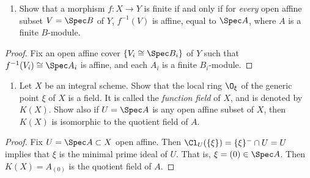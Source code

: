 \documentclass[12pt]{amsart}
\begin{document}
 \begin{enumerate}
   \item[3.4.] {
       Show that a morphism $f:X\to Y$ is finite if and only if for \emph{every} open affine subset $V=\Spec B$ of $Y$, $f^{-1}(V)$ is affine, equal to $\Spec A$, where $A$ is a finite $B$-module.
     }
 \end{enumerate}
 
 \begin{proof}
   Fix an open affine cover $\{V_i\cong \Spec B_i\}$ of $Y$ such that $f^{-1}(V_i)\cong \Spec A_i$ is affine, and each $A_i$ is a finite $B_i$-module.
 \end{proof}
 
 \begin{enumerate}
   \item[3.6.] {
       Let $X$ be an integral scheme.
       Show that the local ring $\O_\xi$ of the generic point $\xi$ of $X$ is a field.
       It is called the \emph{function field} of $X$, and is denoted by $K(X)$.
       Show also if $U=\Spec A$ is any open affine subset of $X$, then $K(X)$ is isomorphic to the quotient field of $A$.
     }
 \end{enumerate}
 
 \begin{proof}
   Fix $U=\Spec A\subset X$ open affine.
   Then $\Cl_U(\{\xi\})=\{\xi\}^-\cap U=U$ implies that $\xi$ is the minimal prime ideal of $U$.
   That is, $\xi=(0)\in \Spec A$.
   Then $K(X)= A_{(0)}$ is the quotient field of $A$.
 \end{proof}

% 
% 
% 
% 
% 
% 
% 
\end{document}
